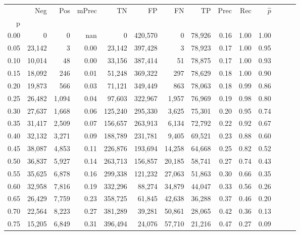 \begin{tabular}{rrrrrrrrrrrrrr}
\toprule
{} &     Neg &    Pos & mPrec &       TN &       FP &      FN &      TP &  Prec &   Rec & $\hat{p}$ \\
p    &         &        &       &          &          &         &         &       &       &           \\
\midrule
0.00 &       0 &      0 &   nan &        0 &  420,570 &       0 &  78,926 &  0.16 &  1.00 &      1.00 \\
0.05 &  23,142 &      3 &  0.00 &   23,142 &  397,428 &       3 &  78,923 &  0.17 &  1.00 &      0.95 \\
0.10 &  10,014 &     48 &  0.00 &   33,156 &  387,414 &      51 &  78,875 &  0.17 &  1.00 &      0.93 \\
0.15 &  18,092 &    246 &  0.01 &   51,248 &  369,322 &     297 &  78,629 &  0.18 &  1.00 &      0.90 \\
0.20 &  19,873 &    566 &  0.03 &   71,121 &  349,449 &     863 &  78,063 &  0.18 &  0.99 &      0.86 \\
0.25 &  26,482 &  1,094 &  0.04 &   97,603 &  322,967 &   1,957 &  76,969 &  0.19 &  0.98 &      0.80 \\
0.30 &  27,637 &  1,668 &  0.06 &  125,240 &  295,330 &   3,625 &  75,301 &  0.20 &  0.95 &      0.74 \\
0.35 &  31,417 &  2,509 &  0.07 &  156,657 &  263,913 &   6,134 &  72,792 &  0.22 &  0.92 &      0.67 \\
0.40 &  32,132 &  3,271 &  0.09 &  188,789 &  231,781 &   9,405 &  69,521 &  0.23 &  0.88 &      0.60 \\
0.45 &  38,087 &  4,853 &  0.11 &  226,876 &  193,694 &  14,258 &  64,668 &  0.25 &  0.82 &      0.52 \\
0.50 &  36,837 &  5,927 &  0.14 &  263,713 &  156,857 &  20,185 &  58,741 &  0.27 &  0.74 &      0.43 \\
0.55 &  35,625 &  6,878 &  0.16 &  299,338 &  121,232 &  27,063 &  51,863 &  0.30 &  0.66 &      0.35 \\
0.60 &  32,958 &  7,816 &  0.19 &  332,296 &   88,274 &  34,879 &  44,047 &  0.33 &  0.56 &      0.26 \\
0.65 &  26,429 &  7,759 &  0.23 &  358,725 &   61,845 &  42,638 &  36,288 &  0.37 &  0.46 &      0.20 \\
0.70 &  22,564 &  8,223 &  0.27 &  381,289 &   39,281 &  50,861 &  28,065 &  0.42 &  0.36 &      0.13 \\
0.75 &  15,205 &  6,849 &  0.31 &  396,494 &   24,076 &  57,710 &  21,216 &  0.47 &  0.27 &      0.09 \\

\end{tabular}

